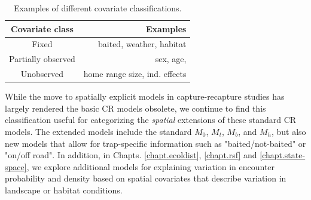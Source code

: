 \begin{table}[ht]
\centering
\caption{Examples of different covariate classifications.}
\begin{tabular}{cr}
\hline \hline
Covariate class & Examples \\
\hline 
Fixed & baited, weather, habitat\\
Partially observed & sex, age, \\
Unobserved &  home range size, ind. effects  \\ \hline
\end{tabular}
\label{covariates.tab.covobs}
\end{table}

While the move to spatially explicit models in capture-recapture
studies has largely rendered the basic CR models
\citep{otis_etal:1978} obsolete, we continue to find this
classification useful for categorizing the {\it spatial} extensions of
these standard CR models.  The extended models include the standard
$M_0$, $M_t$, $M_b$, and $M_h$, but also new models that allow for
trap-specific information such as "baited/not-baited" or "on/off
road".  In addition, in Chapts. \ref{chapt.ecoldist}, \ref{chapt.rsf}
and \ref{chapt.state-space}, we explore additional models for
explaining variation in encounter probability and density based on
spatial covariates that describe variation in landscape or habitat
conditions.

